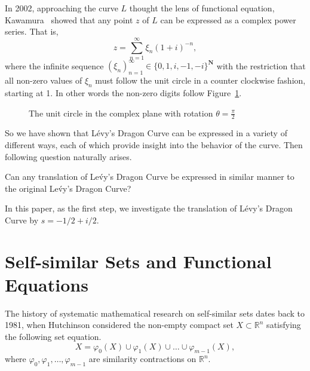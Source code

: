 \documentclass[epsf,10pt]{article}
\newcommand\NN{\mathbf{N}}
\begin{document}
In 2002, approaching the curve $L$ thought the lens of functional equation, Kawamura~\cite{Kawamura-2002} showed that any point $z$ of $L$ can be expressed as a complex power series. That is, 
\begin{equation*}
z= \sum_{n=1}^{\infty} \xi_{n}(1+i)^{-n}, 
\end{equation*}
where the infinite sequence $(\xi_n)_{n=1}^{\infty} \in \{0,1,i,-1,-i\}^{\NN}$ with the restriction that all non-zero values of $\xi_n$ must follow the unit circle in a counter clockwise fashion, starting at 1. In other words the non-zero digits follow Figure~\ref{fig:revdig}.
\begin{figure}[H]
    \begin{center}
\end{center} 
    \caption{The unit circle in the complex plane with rotation $\theta=\frac{\pi}{2}$}
    \label{fig:revdig}
\end{figure}

So we have shown that L\'evy's Dragon Curve can be expressed in a variety of different ways, each of which provide insight into the behavior of the curve. Then following question naturally arises.\medskip

Can any translation of Le\'vy's Dragon Curve be expressed in similar manner to the original Le\'vy's Dragon Curve? 
\medskip

In this paper, as the first step, we investigate the translation of L\'evy's Dragon Curve by $s=-1/2+i/2$.


\section{Self-similar Sets and Functional Equations}

The history of systematic mathematical research on self-similar sets dates back to 1981, when Hutchinson considered the non-empty compact set $X \subset \mathbb{R}^{n}$ satisfying the following set equation.
\begin{equation}
 \label{eq:self-similar}
X= \varphi_{0}(X) \cup \varphi_{1}(X) \cup \dots \cup \varphi_{m-1}(X),
\end{equation}
where $\varphi_{0},\varphi_{1},\dots,\varphi_{m-1}$ are similarity  contractions on $\mathbb{R}^{n}$. 
\end{document}
